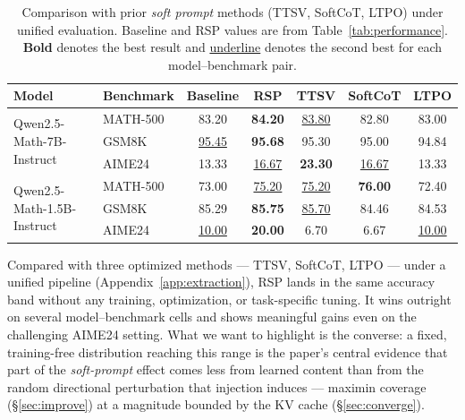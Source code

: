 \begin{table}[!t]
\centering
\caption{Comparison with prior \textit{soft prompt} methods (TTSV, SoftCoT, LTPO) under unified evaluation. Baseline and RSP values are from Table~\ref{tab:performance}. \textbf{Bold} denotes the best result and \underline{underline} denotes the second best for each model--benchmark pair.}
\label{tab:prior_comparison}
\footnotesize
\renewcommand{\arraystretch}{0.9}
\begin{tabular}{llccccc}
\toprule
\textbf{Model} & \textbf{Benchmark} & \textbf{Baseline} & \cellcolor{blue!10}\textbf{RSP} & \textbf{TTSV} & \textbf{SoftCoT} & \textbf{LTPO} \\
\midrule
\multirow{3}{*}{Qwen2.5-Math-7B-Instruct} & MATH-500 & 83.20 & \cellcolor{blue!10}\textbf{84.20} & \underline{83.80} & 82.80 & 83.00 \\
 & GSM8K   & \underline{95.45} & \cellcolor{blue!10}\textbf{95.68} & 95.30 & 95.00 & 94.84 \\
 & AIME24  & 13.33 & \cellcolor{blue!10}\underline{16.67} & \textbf{23.30} & \underline{16.67} & 13.33 \\
\midrule
\multirow{3}{*}{Qwen2.5-Math-1.5B-Instruct} & MATH-500 & 73.00 & \cellcolor{blue!10}\underline{75.20} & \underline{75.20} & \textbf{76.00} & 72.40 \\
 & GSM8K   & 85.29 & \cellcolor{blue!10}\textbf{85.75} & \underline{85.70} & 84.46 & 84.53 \\
 & AIME24  & \underline{10.00} & \cellcolor{blue!10}\textbf{20.00} &  6.70 &  6.67 & \underline{10.00} \\
\bottomrule
\end{tabular}
\end{table}

Compared with three optimized methods --- TTSV, SoftCoT, LTPO --- under a unified pipeline (Appendix~\ref{app:extraction}), RSP lands in the same accuracy band without any training, optimization, or task-specific tuning. It wins outright on several model--benchmark cells and shows meaningful gains even on the challenging AIME24 setting. What we want to highlight is the converse: a fixed, training-free distribution reaching this range is the paper's central evidence that part of the \textit{soft-prompt} effect comes less from learned content than from the random directional perturbation that injection induces --- maximin coverage (\S\ref{sec:improve}) at a magnitude bounded by the KV cache (\S\ref{sec:converge}).

